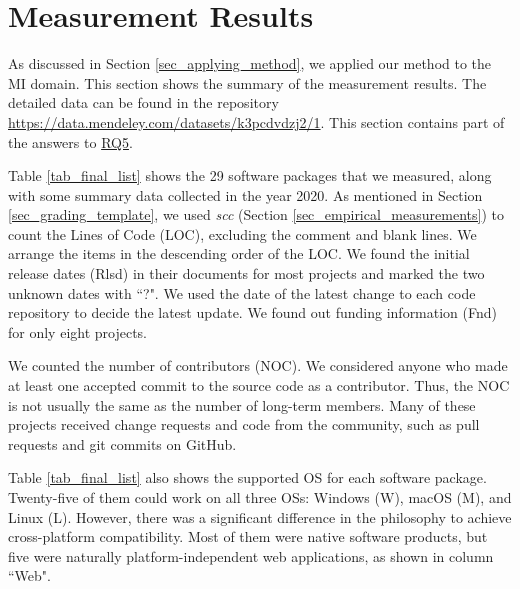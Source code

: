 \chapter{Measurement Results}
\label{ch_results}

As discussed in Section \ref{sec_applying_method}, we applied our method to the MI domain. This section shows the summary of the measurement results. The detailed data can be found in the repository \hyperlink{https://data.mendeley.com/datasets/k3pcdvdzj2/1}{https://data.mendeley.com/datasets/k3pcdvdzj2/1}. This section contains part of the answers to \hyperlink{rq5}{RQ5}.

Table \ref{tab_final_list} shows the 29 software packages that we measured, along with some summary data collected in the year 2020. As mentioned in Section \ref{sec_grading_template}, we used \textit{scc} (Section \ref{sec_empirical_measurements}) to count the Lines of Code (LOC), excluding the comment and blank lines. We arrange the items in the descending order of the LOC. We found the initial release dates (Rlsd) in their documents for most projects and marked the two unknown dates with ``?". We used the date of the latest change to each code repository to decide the latest update. We found out funding information (Fnd) for only eight projects.

We counted the number of contributors (NOC). We considered anyone who made at least one accepted commit to the source code as a contributor. Thus, the NOC is not usually the same as the number of long-term members. Many of these projects received change requests and code from the community, such as pull requests and git commits on GitHub.

Table \ref{tab_final_list} also shows the supported OS for each software package. Twenty-five of them could work on all three OSs: Windows (W), macOS (M), and Linux (L). However, there was a significant difference in the philosophy to achieve cross-platform compatibility. Most of them were native software products, but five were naturally platform-independent web applications, as shown in column ``Web".

